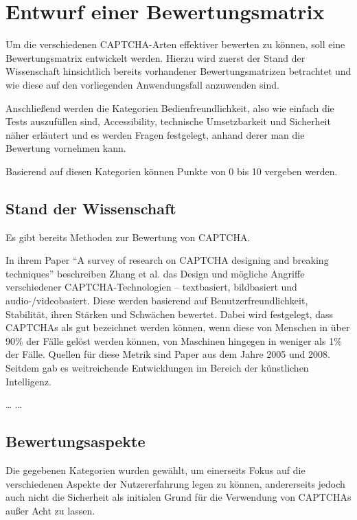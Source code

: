 \chapter{Entwurf einer Bewertungsmatrix}
\label{ch:matrix}

Um die verschiedenen CAPTCHA-Arten effektiver bewerten zu können, soll eine Bewertungsmatrix entwickelt werden.
Hierzu wird zuerst der Stand der Wissenschaft hinsichtlich bereits vorhandener Bewertungsmatrizen betrachtet
und wie diese auf den vorliegenden Anwendungsfall anzuwenden sind.

Anschließend werden die Kategorien Bedienfreundlichkeit, also wie einfach die Tests auszufüllen sind, Accessibility, technische Umsetzbarkeit
und Sicherheit näher erläutert und es werden Fragen festgelegt, anhand derer man die Bewertung vornehmen kann.

Basierend auf diesen Kategorien können Punkte von 0 bis 10 vergeben werden.

\section{Stand der Wissenschaft}
\label{ch:matrix:sdw}

Es gibt bereits Methoden zur Bewertung von CAPTCHA.

In ihrem Paper ``A survey of research on CAPTCHA designing and breaking techniques'' beschreiben Zhang et al. das Design
und mögliche Angriffe verschiedener CAPTCHA-Technologien – textbasiert, bildbasiert und audio-/videobasiert.
Diese werden basierend auf Benutzerfreundlichkeit, Stabilität, ihren Stärken und Schwächen bewertet.  
Dabei wird festgelegt, dass CAPTCHAs als gut bezeichnet werden können, wenn diese von Menschen in über 90\% der Fälle gelöst werden können,
von Maschinen hingegen in weniger als 1\% der Fälle.
Quellen für diese Metrik sind Paper aus dem Jahre 2005 und 2008. \cite[p.75]{surveyofresearch}
Seitdem gab es weitreichende Entwicklungen im Bereich der künstlichen Intelligenz.

\dots
\dots


\section{Bewertungsaspekte}
\label{ch:matrix:aspekte}
Die gegebenen Kategorien wurden gewählt, um einerseits Fokus auf die verschiedenen Aspekte der Nutzererfahrung legen zu können,
andererseits jedoch auch nicht die Sicherheit als initialen Grund für die Verwendung von CAPTCHAs außer Acht zu lassen.

